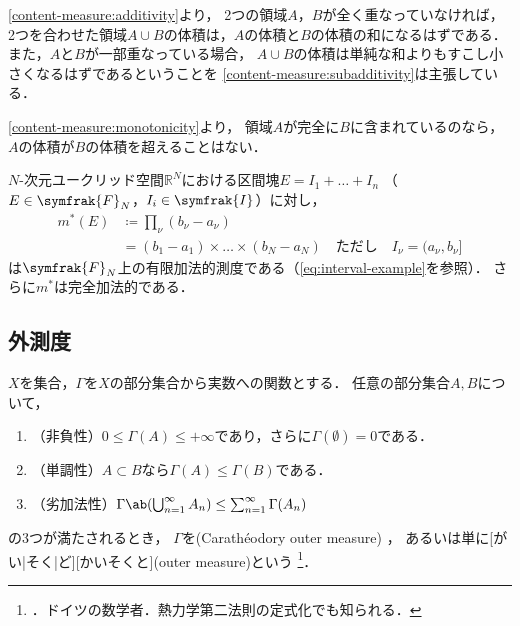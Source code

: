 \documentclass[../sotsu.tex]{subfiles}
\begin{document}
\cref{content-measure:additivity}より，
2つの領域$A$，$B$が全く重なっていなければ，
2つを合わせた領域$A \cup B$の体積は，$A$の体積と$B$の体積の和になるはずである．
また，$A$と$B$が一部重なっている場合，
$A \cup B$の体積は単純な和よりもすこし小さくなるはずであるということを
\cref{content-measure:subadditivity}は主張している．

\cref{content-measure:monotonicity}より，
領域$A$が完全に$B$に含まれているのなら，$A$の体積が$B$の体積を超えることはない．



\begin{proposition}
    \label{thm:Lebesgue-finitely-additive-measure}
    $N$-次元ユークリッド空間$ℝ^N$における区間塊$E = I_1 + \dots + I_n$
    （$E \in \symfrak{F}_N$，$I_i \in \symfrak{I}$）に対し，
    \begin{equation}
        \begin{split}
            m^* (E)  &\coloneq  \prod_\nu (b_\nu - a_\nu)  \\
                     &=  (b_1 - a_1) \times \dots \times (b_N - a_N)
                     \quad \text{ただし} \quad I_\nu = (a_\nu, b_\nu]
        \end{split}
    \end{equation}
    は$\symfrak{F}_N$上の有限加法的測度である（\cref{eq:interval-example}を参照）．
    さらに$m^*$は完全加法的である．
\end{proposition}



\subsection{外測度}

\begin{definition}[外測度]
    \label{dfn:outer-measure}
    $X$を集合，$\Gamma$を$X$の部分集合から実数への関数とする．
    任意の部分集合$A, B$について，
    \begin{enumerate}
        \item （非負性）$0 \leq \Gamma(A) \leq +\infty$であり，さらに$\Gamma(\emptyset) = 0$である．
        \item （単調性）$A \subset B$なら$\Gamma(A) \leq \Gamma(B)$である．
        \item （劣加法性）$\Gamma \ab( \bigcup_{n=1}^{\infty} A_n ) \leq \sum_{n=1}^{\infty} \Gamma(A_n)$
    \end{enumerate}
    の3つが満たされるとき，
    $\Gamma$を(Carathéodory outer measure)%
    \cite{rikagaku-eiwa}，
    あるいは単に[がい|そく|ど][かいそくと](outer measure)という\cite{ito-lebesgue-1963}%
    \footnote{．ドイツの数学者．熱力学第二法則の定式化でも知られる．\cite{nipponica}}．
\end{definition}
\end{document}
